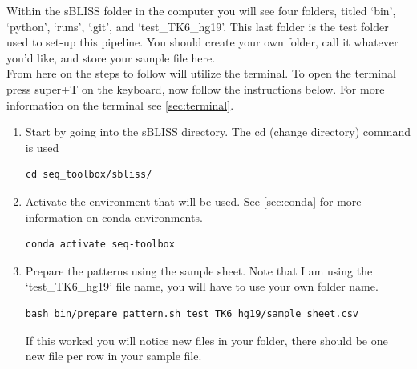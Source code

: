 Within the sBLISS folder in the computer you will see four folders, titled `bin', `python', `runs', `.git', and `test\_TK6\_hg19'. This last folder is the test folder used to set-up this pipeline. You should create your own folder, call it whatever you'd like, and store your sample file here.\\
From here on the steps to follow will utilize the terminal. To open the terminal press super+T on the keyboard, now follow the instructions below. For more information on the terminal see \autoref{sec:terminal}.\\
\begin{enumerate}
\item Start by going into the sBLISS directory. The cd (change directory) command is used
\begin{lstlisting}
cd seq_toolbox/sbliss/
\end{lstlisting}

\item Activate the environment that will be used. See \autoref{sec:conda} for more information on conda environments.
\begin{lstlisting}
conda activate seq-toolbox
\end{lstlisting}

\item Prepare the patterns using the sample sheet. Note that I am using the `test\_TK6\_hg19' file name, you will have to use your own folder name.\\
\begin{lstlisting}
bash bin/prepare_pattern.sh test_TK6_hg19/sample_sheet.csv
\end{lstlisting}
If this worked you will notice new files in your folder, there should be one new file per row in your sample file.


\end{enumerate}
